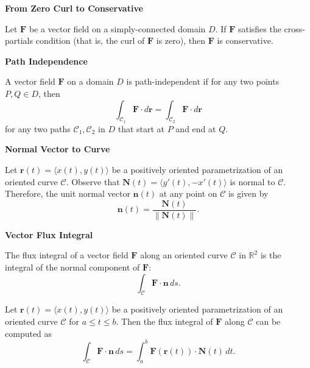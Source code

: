 \documentclass{article}
\newcommand{\R}{\mathbb{R}}
\newenvironment{definition}[1]{
    \par\noindent\textbf{#1}\par\noindent
}{
    \par \vspace{0.5cm}
}
\begin{document}
\begin{definition}{From Zero Curl to Conservative}
Let \(\bm{F}\) be a vector field on a simply-connected domain \(D\). If \(\bm{F}\) satisfies the cross-partials condition (that is, the curl of \(\bm{F}\) is zero), then \(\bm{F}\) is conservative.
\end{definition}

\begin{definition}{Path Independence}
A vector field \(\bm{F}\) on a domain \(D\) is path-independent if for any two points \(P, Q \in D\), then
\[ \int_{\mathcal{C}_1} \bm{F} \cdot d\bm{r} = \int_{\mathcal{C}_2} \bm{F} \cdot d\bm{r} \]
for any two paths \(\mathcal{C}_1, \mathcal{C}_2\) in \(D\) that start at \(P\) and end at \(Q\).
\end{definition}

\begin{definition}{Normal Vector to Curve}
Let \(\bm{r}(t) = \langle x(t), y(t) \rangle\) be a positively oriented parametrization of an oriented curve \(\mathcal{C}\). Observe that \(\bm{N}(t) = \langle y'(t), -x'(t) \rangle\) is normal to \(\mathcal{C}\). Therefore, the unit normal vector \(\bm{n}(t)\) at any point on \(\mathcal{C}\) is given by
\[ \bm{n}(t) = \frac{\bm{N}(t)}{\|\bm{N}(t)\|}. \]
\end{definition}

\begin{definition}{Vector Flux Integral}
The flux integral of a vector field \(\bm{F}\) along an oriented curve \(\mathcal{C}\) in \(\R^2\) is the integral of the normal component of \(\bm{F}\):
\[ \int_{\mathcal{C}} \bm{F} \cdot \bm{n} \, ds. \]

Let \(\bm{r}(t) = \langle x(t), y(t) \rangle\) be a positively oriented parametrization of an oriented curve \(\mathcal{C}\) for \(a \leq t \leq b\). Then the flux integral of \(\bm{F}\) along \(\mathcal{C}\) can be computed as
\[ \int_{\mathcal{C}} \bm{F} \cdot \bm{n} \, ds = \int_{a}^{b} \bm{F}(\bm{r}(t)) \cdot \bm{N}(t) \, dt. \]
\end{definition}
\end{document}
